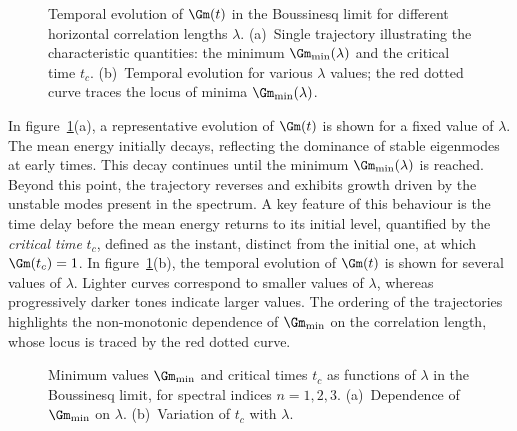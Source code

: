 \begin{figure}
  \centering
  \begin{minipage}{0.48\textwidth}
    \centering
    
  \end{minipage}
  \hfill
  \begin{minipage}{0.48\textwidth}
    \centering
    
  \end{minipage}
  \caption{Temporal evolution of \(\Gm(t)\) in the Boussinesq limit for different horizontal
  correlation lengths \(\lambda\). (a)~Single trajectory illustrating the characteristic
  quantities: the minimum \(\Gm_{\min}(\lambda)\) and the critical time \(t_c\). (b)~Temporal
  evolution for various \(\lambda\) values; the red dotted curve traces the locus of minima
  \(\Gm_{\min}(\lambda)\).}
  \label{fig:BQ_P3_Gmean}
\end{figure}

In figure~\ref{fig:BQ_P3_Gmean}(a), a representative evolution of \(\Gm(t)\) is shown for a
fixed value of \(\lambda\). The mean energy initially decays, reflecting the dominance of stable
eigenmodes at early times. This decay continues until the minimum \(\Gm_{\min}(\lambda)\) is
reached. Beyond this point, the trajectory reverses and exhibits growth driven by the unstable
modes present in the spectrum. A key feature of this behaviour is the time delay before the mean
energy returns to its initial level, quantified by the \emph{critical time} \(t_c\), defined as
the instant, distinct from the initial one, at which \(\Gm(t_c) = 1\). In
figure~\ref{fig:BQ_P3_Gmean}(b), the temporal evolution of \(\Gm(t)\) is shown for several
values of \(\lambda\). Lighter curves correspond to smaller values of \(\lambda\), whereas
progressively darker tones indicate larger values. The ordering of the trajectories highlights the
non-monotonic dependence of \(\Gm_{\min}\) on the correlation length, whose locus is traced by
the red dotted curve.

\begin{figure}
  \centering
  \begin{minipage}{0.48\textwidth}
    \centering
    
  \end{minipage}
  \hfill
  \begin{minipage}{0.48\textwidth}
    \centering
    
  \end{minipage}
  \caption{Minimum values \(\Gm_{\min}\) and critical times \(t_c\) as functions of \(\lambda\)
  in the Boussinesq limit, for spectral indices \(n=1,2,3\). (a)~Dependence of \(\Gm_{\min}\) on
  \(\lambda\). (b)~Variation of \(t_c\) with \(\lambda\).}
  \label{fig:BQ_P3_Gmean_analysis}
\end{figure}

